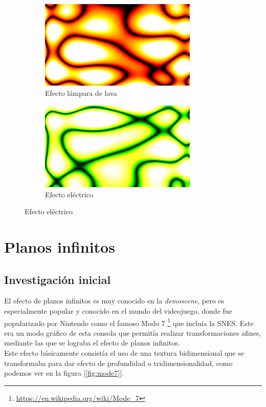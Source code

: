 \begin{figure}[h]
	\centering
	\begin{subfigure}[b]{0.48\textwidth}
		\centering
		\includegraphics[width=7.5cm]{archivos/redplasma}
		\caption{Efecto lámpara de lava}
	\end{subfigure}
	\begin{subfigure}[b]{0.48\textwidth}
		\centering
		\includegraphics[width=7.5cm]{archivos/greenplasma}
		\caption{Efecto eléctrico}
	\end{subfigure}
\end{figure}

\section{Planos infinitos}

\subsection{Investigación inicial}

El efecto de planos infinitos es muy conocido en la \emph{demoscene}, pero es especialmente popular y conocido en el mundo del videojuego, donde fue popularizado por Nintendo como el famoso Modo 7 \footnote{\url{https://en.wikipedia.org/wiki/Mode_7}} que incluía la SNES. Este era un modo gráfico de esta consola que permitía realizar transformaciones afines, mediante las que se lograba el efecto de planos infinitos.\\

Este efecto básicamente consistía el uso de una textura bidimensional que se transformaba para dar efecto de profundidad o tridimensionalidad, como podemos ver en la figura [\ref{fig:mode7}].\\

